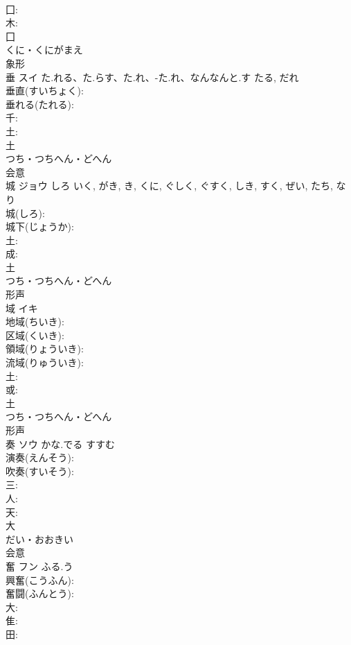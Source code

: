 \documentclass[8pt]{extreport}
\begin{document}
\begin{CJK}{UTF8}{min}
\\	囗: 
\\	木: 
\\	囗	
\\	くに・くにがまえ	
\\	象形 
\\	垂	スイ	た.れる、た.らす、た.れ、-た.れ、なんなんと.す	たる, だれ	
\\	垂直(すいちょく): 
\\	垂れる(たれる): 
\\	千: 
\\	土: 
\\	土	
\\	つち・つちへん・どへん	
\\	会意 
\\	城	ジョウ	しろ	いく, がき, き, くに, ぐしく, ぐすく, しき, すく, ぜい, たち, なり	
\\	城(しろ): 
\\	城下(じょうか): 
\\	土: 
\\	成: 
\\	土	
\\	つち・つちへん・どへん	
\\	形声 
\\	域	イキ			
\\	地域(ちいき): 
\\	区域(くいき): 
\\	領域(りょういき): 
\\	流域(りゅういき): 
\\	土: 
\\	或: 
\\	土	
\\	つち・つちへん・どへん	
\\	形声 
\\	奏	ソウ	かな.でる	すすむ	
\\	演奏(えんそう): 
\\	吹奏(すいそう): 
\\	三: 
\\	人: 
\\	天: 
\\	大	
\\	だい・おおきい	
\\	会意 
\\	奮	フン	ふる.う		
\\	興奮(こうふん): 
\\	奮闘(ふんとう): 
\\	大: 
\\	隹: 
\\	田: 

\end{CJK}
\end{document}
